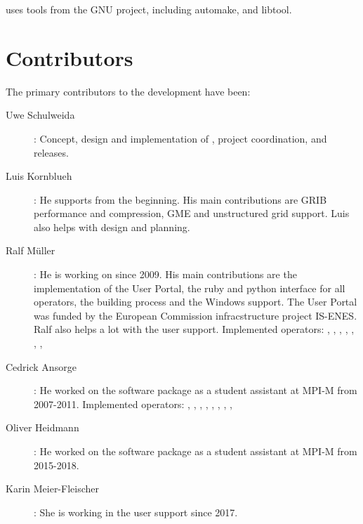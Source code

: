 {\CDO} uses tools from the GNU project, including automake, and libtool. 

\section{Contributors}

The primary contributors to the {\CDO} development have been: 

\begin{description}
\item[Uwe Schulweida]: Concept, design and implementation of {\CDO}, project coordination, and releases.

\item[Luis Kornblueh]: He supports {\CDO} from the beginning. 
His main contributions are GRIB performance and compression, GME and unstructured grid support.
Luis also helps with design and planning.

\item[Ralf M\"uller]: He is working on {\CDO} since 2009. 
His main contributions are the implementation of the User Portal, 
the ruby and python interface for all {\CDO} operators, the building process and the Windows support.
The {\CDO} User Portal was funded by the European Commission infracstructure project IS-ENES.
Ralf also helps a lot with the user support.
Implemented operators: {}, {}, {}, {},
{}, {}, {}, {}

\item[Cedrick Ansorge]: He worked on the {\CDO} software package as a student assistant at MPI-M from 2007-2011.
Implemented operators: {}, {}, {}, {},
 {}, {}, {}, {}, {}

\item[Oliver Heidmann]: He worked on the {\CDO} software package as a student assistant at MPI-M from 2015-2018.

\item[Karin Meier-Fleischer]: She is working in the {\CDO} user support since 2017.


\end{description}
